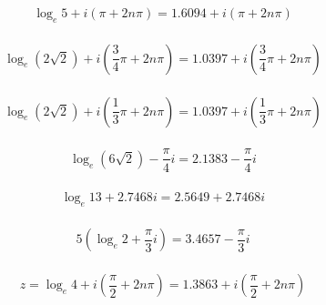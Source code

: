 \documentclass{article}
\begin{document}
\setcounter{subsubsection}{22}
\subsubsection{}

\[\log_e 5 + i (\pi + 2 n \pi) = 1.6094 + i (\pi + 2 n \pi)\]

\setcounter{subsubsection}{24}
\subsubsection{}

\[\log_e (2 \sqrt{2}) + i \left( \frac{3}{4} \pi + 2 n \pi \right) = 1.0397 + i \left( \frac{3}{4} \pi + 2 n \pi \right)\]

\setcounter{subsubsection}{26}
\subsubsection{}

\[\log_e (2 \sqrt{2}) + i \left( \frac{1}{3} \pi + 2 n \pi \right) = 1.0397 + i \left( \frac{1}{3} \pi + 2 n \pi \right)\]

\setcounter{subsubsection}{28}
\subsubsection{}

\[\log_e (6 \sqrt{2}) - \frac{\pi}{4} i = 2.1383 - \frac{\pi}{4} i\]

\setcounter{subsubsection}{30}
\subsubsection{}

\[\log_e 13 + 2.7468 i = 2.5649 + 2.7468 i\]

\setcounter{subsubsection}{32}
\subsubsection{}

\[5 \left( \log_e 2 + \frac{\pi}{3} i \right) = 3.4657 - \frac{\pi}{3} i\]

\setcounter{subsubsection}{34}
\subsubsection{}

\[z = \log_e 4 + i \left( \frac{\pi}{2} + 2 n \pi \right) = 1.3863 + i \left( \frac{\pi}{2} + 2 n \pi \right)\]
\end{document}
